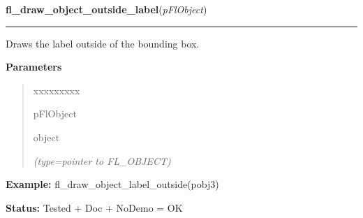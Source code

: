 \hspace{.8\funcindent}\begin{boxedminipage}{\funcwidth}

    \raggedright \textbf{fl\_draw\_object\_outside\_label}(\textit{pFlObject})

    \vspace{-1.5ex}

    \rule{\textwidth}{0.5\fboxrule}
\setlength{\parskip}{2ex}
    Draws the label outside of the bounding box.

\setlength{\parskip}{1ex}
      \textbf{Parameters}
      \vspace{-1ex}

      \begin{quote}
        \begin{Ventry}{xxxxxxxxx}

          \item[pFlObject]

          object

            {\it (type=pointer to FL\_OBJECT)}

        \end{Ventry}

      \end{quote}

\textbf{Example:} fl\_draw\_object\_label\_outside(pobj3)



\textbf{Status:} Tested + Doc + NoDemo = OK



    \end{boxedminipage}

    \label{xformslib:flbasic:fl_get_object_component}

    \vspace{0.5ex}

